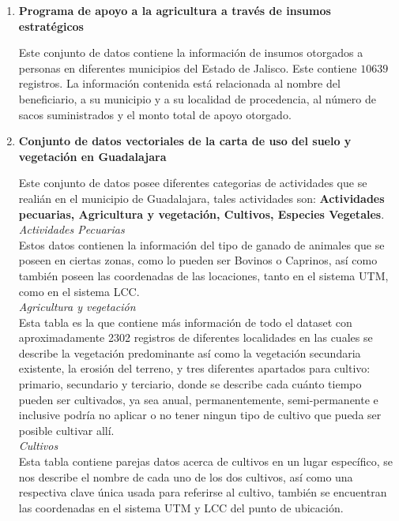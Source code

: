\documentclass[10pt,letterpaper]{article}
\begin{document}
\begin{enumerate}
\item \textbf{Programa de apoyo a la agricultura a trav\'es de insumos estrat\'egicos} 

Este conjunto de datos contiene la informaci\'on de insumos otorgados a personas en diferentes municipios del Estado de Jalisco.
Este contiene $10639$ registros.
La informaci\'on contenida est\'a relacionada al nombre del beneficiario, a su municipio y a su localidad de procedencia, al n\'umero de sacos suministrados y el monto total de apoyo otorgado.

\item \textbf{Conjunto de datos vectoriales de la carta de uso del suelo y vegetaci\'on en Guadalajara}

Este conjunto de datos posee diferentes categorias de actividades que se reali\'an en el municipio de Guadalajara, tales actividades son: \textbf{Actividades pecuarias, Agricultura y vegetaci\'on, Cultivos, Especies Vegetales}.\\

\textit{Actividades Pecuarias} \\
Estos datos contienen la informaci\'on del tipo de ganado de animales que se poseen en ciertas zonas, como lo pueden ser Bovinos o Caprinos, as\'i como tambi\'en poseen las coordenadas de las locaciones, tanto en el sistema UTM, como en el sistema LCC. \\

\textit{Agricultura y vegetaci\'on}\\
Esta tabla es la que contiene m\'as informaci\'on de todo el dataset con aproximadamente 2302 registros de diferentes localidades en las cuales se describe la vegetaci\'on predominante as\'i como la vegetaci\'on secundaria existente, la erosi\'on del terreno, y tres diferentes apartados para cultivo: primario, secundario y terciario, donde se describe cada cu\'anto tiempo pueden ser cultivados, ya sea anual, permanentemente, semi-permanente e inclusive podr\'ia no aplicar o no tener ningun tipo de cultivo que pueda ser posible cultivar all\'i.\\

\textit{Cultivos}\\
Esta tabla contiene parejas datos acerca de cultivos en un lugar espec\'ifico, se nos describe el nombre de cada uno de los dos cultivos, as\'i como una respectiva clave \'unica usada para referirse al cultivo, tambi\'en se encuentran las coordenadas en el sistema UTM y LCC del punto de ubicaci\'on.


\end{enumerate}
\end{document}
